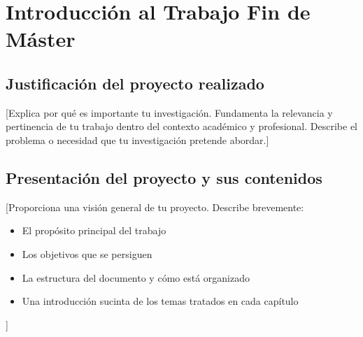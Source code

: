 \chapter{Introducción al Trabajo Fin de Máster}

\section{Justificación del proyecto realizado}

[Explica por qué es importante tu investigación. Fundamenta la relevancia y pertinencia de tu
trabajo dentro del contexto académico y profesional. Describe el problema o necesidad que tu
investigación pretende abordar.]

\section{Presentación del proyecto y sus contenidos}

[Proporciona una visión general de tu proyecto. Describe brevemente:

\begin{itemize}
    \item El propósito principal del trabajo
    \item Los objetivos que se persiguen
    \item La estructura del documento y cómo está organizado
    \item Una introducción sucinta de los temas tratados en cada capítulo
\end{itemize}
]